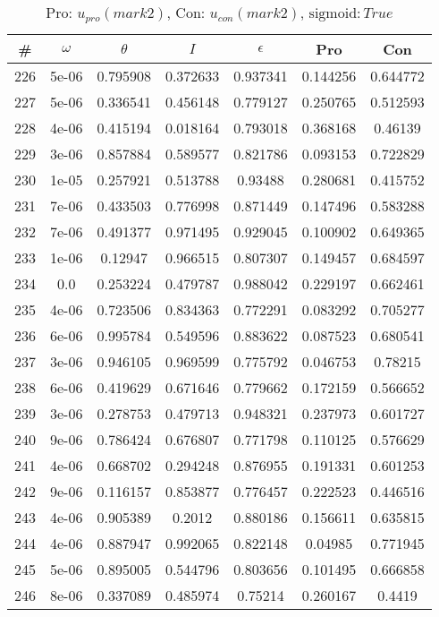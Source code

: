 \newpage
\begin{table}
\caption{Pro: $u_{pro} (mark 2)$, Con: $u_{con} (mark 2)$, $\mathrm{sigmoid}: True$}
\begin{tabular*}{\linewidth}{c|c|c|c|c|c|c}
\# & $\omega$ & $\theta$ & $I$ & $\epsilon$ & Pro & Con \\
\hline
226 & 5e-06 & 0.795908 & 0.372633 & 0.937341 & 0.144256 & 0.644772\\
227 & 5e-06 & 0.336541 & 0.456148 & 0.779127 & 0.250765 & 0.512593\\
228 & 4e-06 & 0.415194 & 0.018164 & 0.793018 & 0.368168 & 0.46139\\
229 & 3e-06 & 0.857884 & 0.589577 & 0.821786 & 0.093153 & 0.722829\\
230 & 1e-05 & 0.257921 & 0.513788 & 0.93488 & 0.280681 & 0.415752\\
231 & 7e-06 & 0.433503 & 0.776998 & 0.871449 & 0.147496 & 0.583288\\
232 & 7e-06 & 0.491377 & 0.971495 & 0.929045 & 0.100902 & 0.649365\\
233 & 1e-06 & 0.12947 & 0.966515 & 0.807307 & 0.149457 & 0.684597\\
234 & 0.0 & 0.253224 & 0.479787 & 0.988042 & 0.229197 & 0.662461\\
235 & 4e-06 & 0.723506 & 0.834363 & 0.772291 & 0.083292 & 0.705277\\
236 & 6e-06 & 0.995784 & 0.549596 & 0.883622 & 0.087523 & 0.680541\\
237 & 3e-06 & 0.946105 & 0.969599 & 0.775792 & 0.046753 & 0.78215\\
238 & 6e-06 & 0.419629 & 0.671646 & 0.779662 & 0.172159 & 0.566652\\
239 & 3e-06 & 0.278753 & 0.479713 & 0.948321 & 0.237973 & 0.601727\\
240 & 9e-06 & 0.786424 & 0.676807 & 0.771798 & 0.110125 & 0.576629\\
241 & 4e-06 & 0.668702 & 0.294248 & 0.876955 & 0.191331 & 0.601253\\
242 & 9e-06 & 0.116157 & 0.853877 & 0.776457 & 0.222523 & 0.446516\\
243 & 4e-06 & 0.905389 & 0.2012 & 0.880186 & 0.156611 & 0.635815\\
244 & 4e-06 & 0.887947 & 0.992065 & 0.822148 & 0.04985 & 0.771945\\
245 & 5e-06 & 0.895005 & 0.544796 & 0.803656 & 0.101495 & 0.666858\\
246 & 8e-06 & 0.337089 & 0.485974 & 0.75214 & 0.260167 & 0.4419\\

\end{tabular*}
\end{table}
